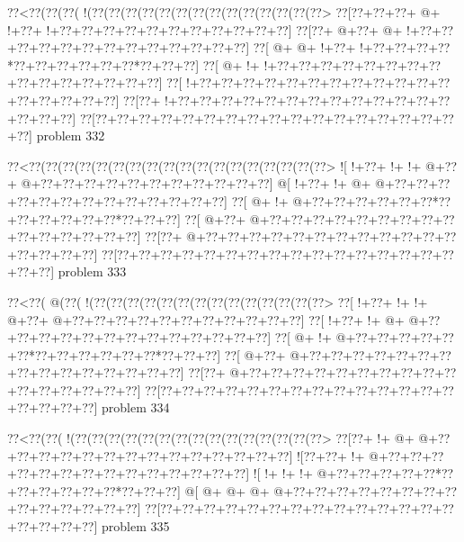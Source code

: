 \vbox{\vbox{\goo
\0??<\0??(\0??(\0??(\- !(\0??(\0??(\0??(\0??(\0??(\0??(\0??(\0??(\0??(\0??(\0??(\0??(\0??(\0??>
\0??[\0??+\0??+\0??+\- @+\- !+\0??+\- !+\0??+\0??+\0??+\0??+\0??+\0??+\0??+\0??+\0??+\0??+\0??]
\0??[\0??+\- @+\0??+\- @+\- !+\0??+\0??+\0??+\0??+\0??+\0??+\0??+\0??+\0??+\0??+\0??+\0??+\0??]
\0??[\- @+\- @+\- !+\0??+\- !+\0??+\0??+\0??+\0??*\0??+\0??+\0??+\0??+\0??+\0??*\0??+\0??+\0??]
\0??[\- @+\- !+\- !+\0??+\0??+\0??+\0??+\0??+\0??+\0??+\0??+\0??+\0??+\0??+\0??+\0??+\0??+\0??]
\0??[\- !+\0??+\0??+\0??+\0??+\0??+\0??+\0??+\0??+\0??+\0??+\0??+\0??+\0??+\0??+\0??+\0??+\0??]
\0??[\0??+\- !+\0??+\0??+\0??+\0??+\0??+\0??+\0??+\0??+\0??+\0??+\0??+\0??+\0??+\0??+\0??+\0??]
\0??[\0??+\0??+\0??+\0??+\0??+\0??+\0??+\0??+\0??+\0??+\0??+\0??+\0??+\0??+\0??+\0??+\0??+\0??]
}
\hfil problem 332\hfil\break
}



\vbox{\vbox{\goo
\0??<\0??(\0??(\0??(\0??(\0??(\0??(\0??(\0??(\0??(\0??(\0??(\0??(\0??(\0??(\0??(\0??(\0??(\0??>
\- ![\- !+\0??+\- !+\- !+\- @+\0??+\- @+\0??+\0??+\0??+\0??+\0??+\0??+\0??+\0??+\0??+\0??+\0??]
\- @[\- !+\0??+\- !+\- @+\- @+\0??+\0??+\0??+\0??+\0??+\0??+\0??+\0??+\0??+\0??+\0??+\0??+\0??]
\0??[\- @+\- !+\- @+\0??+\0??+\0??+\0??+\0??+\0??*\0??+\0??+\0??+\0??+\0??+\0??*\0??+\0??+\0??]
\0??[\- @+\0??+\- @+\0??+\0??+\0??+\0??+\0??+\0??+\0??+\0??+\0??+\0??+\0??+\0??+\0??+\0??+\0??]
\0??[\0??+\- @+\0??+\0??+\0??+\0??+\0??+\0??+\0??+\0??+\0??+\0??+\0??+\0??+\0??+\0??+\0??+\0??]
\0??[\0??+\0??+\0??+\0??+\0??+\0??+\0??+\0??+\0??+\0??+\0??+\0??+\0??+\0??+\0??+\0??+\0??+\0??]
}
\hfil problem 333\hfil\break
}



\vbox{\vbox{\goo
\0??<\0??(\- @(\0??(\- !(\0??(\0??(\0??(\0??(\0??(\0??(\0??(\0??(\0??(\0??(\0??(\0??(\0??(\0??>
\0??[\- !+\0??+\- !+\- !+\- @+\0??+\- @+\0??+\0??+\0??+\0??+\0??+\0??+\0??+\0??+\0??+\0??+\0??]
\0??[\- !+\0??+\- !+\- @+\- @+\0??+\0??+\0??+\0??+\0??+\0??+\0??+\0??+\0??+\0??+\0??+\0??+\0??]
\0??[\- @+\- !+\- @+\0??+\0??+\0??+\0??+\0??+\0??*\0??+\0??+\0??+\0??+\0??+\0??*\0??+\0??+\0??]
\0??[\- @+\0??+\- @+\0??+\0??+\0??+\0??+\0??+\0??+\0??+\0??+\0??+\0??+\0??+\0??+\0??+\0??+\0??]
\0??[\0??+\- @+\0??+\0??+\0??+\0??+\0??+\0??+\0??+\0??+\0??+\0??+\0??+\0??+\0??+\0??+\0??+\0??]
\0??[\0??+\0??+\0??+\0??+\0??+\0??+\0??+\0??+\0??+\0??+\0??+\0??+\0??+\0??+\0??+\0??+\0??+\0??]
}
\hfil problem 334\hfil\break
}



\vbox{\vbox{\goo
\0??<\0??(\0??(\- !(\0??(\0??(\0??(\0??(\0??(\0??(\0??(\0??(\0??(\0??(\0??(\0??(\0??(\0??(\0??>
\0??[\0??+\- !+\- @+\- @+\0??+\0??+\0??+\0??+\0??+\0??+\0??+\0??+\0??+\0??+\0??+\0??+\0??+\0??]
\- ![\0??+\0??+\- !+\- @+\0??+\0??+\0??+\0??+\0??+\0??+\0??+\0??+\0??+\0??+\0??+\0??+\0??+\0??]
\- ![\- !+\- !+\- !+\- @+\0??+\0??+\0??+\0??+\0??*\0??+\0??+\0??+\0??+\0??+\0??*\0??+\0??+\0??]
\- @[\- @+\- @+\- @+\- @+\0??+\0??+\0??+\0??+\0??+\0??+\0??+\0??+\0??+\0??+\0??+\0??+\0??+\0??]
\0??[\0??+\0??+\0??+\0??+\0??+\0??+\0??+\0??+\0??+\0??+\0??+\0??+\0??+\0??+\0??+\0??+\0??+\0??]
}
\hfil problem 335\hfil\break
}



